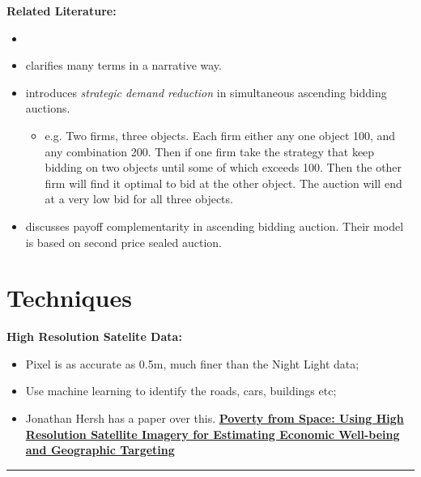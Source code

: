 \documentclass{book}
\theoremstyle{plain}
\theoremstyle{definition}
\newcommand{\myline}{\vspace{3mm} \hrule \vspace{4mm}}
\begin{document}
\noindent
\textbf{Related Literature:}
\begin{itemize}
	\item \cite{McMillan:1994bc}

	\item \cite{Cramton2000} clarifies many terms in a narrative way. 

	\item \cite{Weber:1997ce} introduces \textit{strategic demand reduction} in simultaneous ascending bidding auctions.
	\begin{itemize}
		\item e.g. Two firms, three objects. Each firm either any one object 100, and any combination 200. Then if one firm take the strategy that keep bidding on two objects until some of which exceeds 100. Then the other firm will find it optimal to bid at the other object. The auction will end at a very low bid for all three objects.
	\end{itemize}

	\item \cite{Krishna:1996fo} discusses payoff complementarity in ascending bidding auction. Their model is based on second price sealed auction.

\end{itemize}





\section{Techniques} %
\label{sub:techniques}


\noindent
\textbf{High Resolution Satelite Data:}
\begin{itemize}
	\item Pixel is as accurate as 0.5m, much finer than the Night Light data;
	\item Use machine learning to identify the roads, cars, buildings etc;
	\item Jonathan Hersh has a paper over this. \textbf{\href{https://www.dropbox.com/s/zeph7rrch2rwfwp/PovSpace_JMP_Oct31.pdf?dl=0}{Poverty from Space: Using High Resolution Satellite Imagery for Estimating Economic Well-being and Geographic Targeting}}
\end{itemize}

\myline
\end{document}
